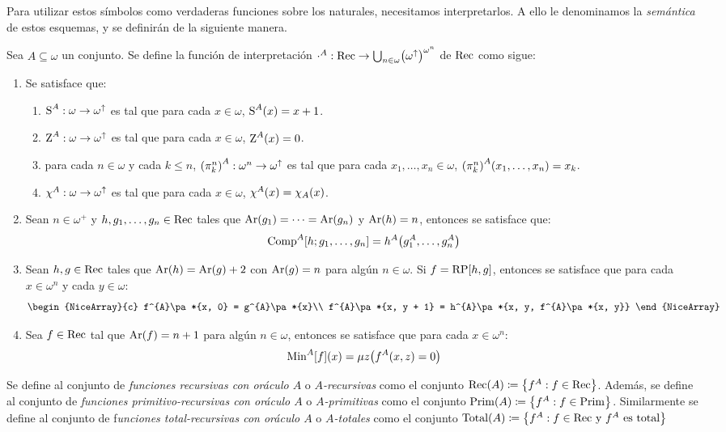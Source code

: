 Para utilizar estos símbolos como verdaderas funciones sobre los naturales, necesitamos interpretarlos. A ello le denominamos la \emph{semántica} de estos esquemas, y se definirán de la siguiente manera.

\begin{definition}
	Sea $A\subseteq\omega$ un conjunto. Se define la función de interpretación $\cdot^{A}:\RECURSIVO\to\bigcup_{n\in\omega}\pa*{\omega^{\DIVERGE}}^{\omega^{n}}$ de $\RECURSIVO$ como sigue:
	\begin{enumerate}
		\item Se satisface que: 
		\begin{enumerate}
			\item $\SUCESOR^{A}:\omega\to\omega^{\DIVERGE}$ es tal que para cada $x\in\omega$, $\SUCESOR^{A}\pa*{x} = x + 1$.
			\item $\CERO^{A}:\omega\to\omega^{\DIVERGE}$ es tal que para cada $x\in\omega$, $\CERO^{A}\pa*{x} = 0$.
			\item para cada $n\in\omega$ y cada $k\leq n$, $\pa*{\PROYECCION{n}{k}}^{A}:\omega^{n}\to\omega^{\DIVERGE}$ es tal que para cada $x_{1},\dotsc, x_{n}\in\omega$, $\pa*{\PROYECCION{n}{k}}^{A}\pa*{x_{1},\dotsc, x_{n}} = x_{k}$.
			\item $\chi^{A}:\omega\to\omega^{\DIVERGE}$ es tal que para cada $x\in\omega$, $\chi^{A}\pa*{x} =\CARACTERISTICA{A}\pa*{x}$.
		\end{enumerate}
		\item Sean $n\in\omega^{+}$ y $h, g_{1},\dotsc, g_{n}\in\RECURSIVO$ tales que $\ARIDAD\pa*{g_{1}} =\dotsb =\ARIDAD\pa*{g_{n}}$ y $\ARIDAD\pa*{h} = n$, entonces se satisface que:
		\[
			\COMPOSICION^{A}\bra*{h; g_{1},\dotsc, g_{n}} = h^{A}\pa*{g_{1}^{A},\dotsc, g_{n}^{A}}
		\]
		\item Sean $h, g\in\RECURSIVO$ tales que $\ARIDAD\pa*{h} =\ARIDAD\pa*{g} + 2$ con $\ARIDAD\pa*{g} = n$ para algún $n\in\omega$. Si $f =\RECURSION\bra*{h, g}$, entonces se satisface que para cada $x\in\omega^{n}$ y cada $y\in\omega$:
		\[
			\begin{NiceArray}{c}
				f^{A}\pa*{x, 0} = g^{A}\pa*{x}\\
				f^{A}\pa*{x, y + 1} = h^{A}\pa*{x, y, f^{A}\pa*{x, y}}
			\end{NiceArray}
		\]
		\item Sea $f\in\RECURSIVO$ tal que $\ARIDAD\pa*{f} = n + 1$ para algún $n\in\omega$, entonces se satisface que para cada $x\in\omega^{n}$:
		\[
			\MINIMIZACION^{A}\bra*{f}\pa*{x} =\mu z\pa*{f^{A}\pa*{x, z} = 0}
		\]
	\end{enumerate}
	Se define al conjunto de \emph{funciones recursivas con oráculo $A$} o \emph{$A$-recursivas} como el conjunto $\RECURSIVO\pa*{A}\coloneqq\set*{f^{A}: f\in\RECURSIVO}$. Además, se define al conjunto de \emph{funciones primitivo-recursivas con oráculo $A$} o \emph{$A$-primitivas} como el conjunto $\PRIMITIVO\pa*{A}\coloneqq\set*{f^{A}: f\in\PRIMITIVO}$. Similarmente se define al conjunto de f\emph{unciones total-recursivas con oráculo $A$} o \emph{$A$-totales} como el conjunto $\TOTAL\pa*{A}\coloneqq\set*{f^{A}:f\in\RECURSIVO\text{ y $f^{A}$ es total}}$
\end{definition}

